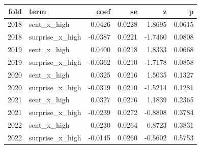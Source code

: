 \begin{tabular}{rlrrrr}
\toprule
fold & term & coef & se & z & p \\
\midrule
2018 & sent\_x\_high & 0.0426 & 0.0228 & 1.8695 & 0.0615 \\
2018 & surprise\_x\_high & -0.0387 & 0.0221 & -1.7460 & 0.0808 \\
2019 & sent\_x\_high & 0.0400 & 0.0218 & 1.8333 & 0.0668 \\
2019 & surprise\_x\_high & -0.0362 & 0.0210 & -1.7178 & 0.0858 \\
2020 & sent\_x\_high & 0.0325 & 0.0216 & 1.5035 & 0.1327 \\
2020 & surprise\_x\_high & -0.0319 & 0.0210 & -1.5214 & 0.1281 \\
2021 & sent\_x\_high & 0.0327 & 0.0276 & 1.1839 & 0.2365 \\
2021 & surprise\_x\_high & -0.0239 & 0.0272 & -0.8808 & 0.3784 \\
2022 & sent\_x\_high & 0.0230 & 0.0264 & 0.8723 & 0.3831 \\
2022 & surprise\_x\_high & -0.0145 & 0.0260 & -0.5602 & 0.5753 \\
\bottomrule
\end{tabular}
